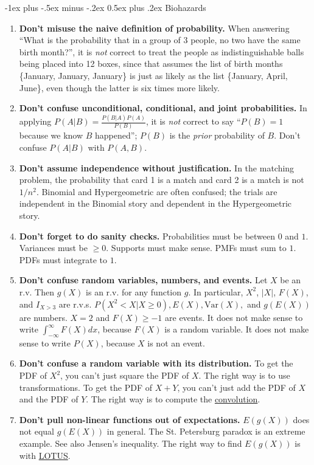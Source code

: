 \documentclass[6pt, landscape]{article}
\makeatletter
\renewcommand{\section}{\@startsection{section}{1}{0mm}%
                                {-1ex plus -.5ex minus -.2ex}%
                                {0.5ex plus .2ex}%
                                {\normalfont\bfseries}}
\newcommand{\var}{\textrm{Var}}
\makeatother
\begin{document}
\begin{multicols}{3}
        \section{Biohazards}
        \begin{enumerate}
                \item \textbf{Don't misuse the naive definition of probability.}   When answering ``What is the probability that in a group of 3 people, no two have the same birth month?'', it is \emph{not} correct to treat the people as indistinguishable balls being placed into 12 boxes, since that assumes the list of birth months \{January, January, January\} is just as likely as the list \{January, April, June\}, even though the latter is six times more likely. \\
                \item \textbf{Don't confuse unconditional, conditional, and joint probabilities.}  In applying $P(A|B) = \frac{P(B|A)P(A)}{P(B)}$, it is \emph{not} correct to say ``$P(B) = 1$ because we know  $B$ happened''; $P(B)$ is the \emph{prior} probability of $B$. Don't confuse $P(A|B)$ with $P(A,B)$. \\
                \item \textbf{Don't assume independence without justification.}  In the matching problem, the probability that card 1 is a match and card 2 is a match is not $1/n^2$.  Binomial and Hypergeometric are often confused; the trials are independent in the Binomial story and dependent in the Hypergeometric story. \\
                \item \textbf{Don't forget to do sanity checks.} Probabilities must be between $0$ and $1$. Variances must be $\geq 0$. Supports must make sense. PMFs must sum to $1$. PDFs must integrate to $1$. \\
                \item \textbf{Don't confuse random variables, numbers, and events.}  Let $X$ be an r.v. Then $g(X)$ is an r.v. for any function $g$. In particular, $X^2$, $|X|$, $F(X)$, and $I_{X>3}$ are r.v.s. $P(X^2 < X | X \geq 0), E(X), \var(X), $ and $g(E(X))$ are numbers. $X = 2$ and $F(X) \geq -1$ are events. It does not make sense to write $\int_{-\infty}^\infty F(X) dx$, because $F(X)$ is a random variable. It does not make sense to write $P(X)$, because $X$ is not an event. \\
                \item \textbf{Don't confuse a random variable with its distribution.}  To get the PDF of $X^2$, you can't just square the PDF of $X$. The right way is to use transformations. To get the PDF of $X + Y$, you can't just add the PDF of $X$ and the PDF of $Y$. The right way is to compute the \hyperref[convolutions]{convolution}.
                \item \textbf{Don't pull non-linear functions out of expectations.} $E(g(X))$ does not equal $g(E(X))$ in general. The St. Petersburg paradox is an extreme example.  See also Jensen's inequality. The right way to find $E(g(X))$ is with \hyperref[lotus]{LOTUS}.
        \end{enumerate}

\end{multicols}
\end{document}
